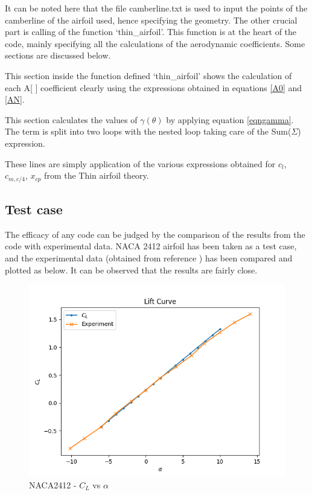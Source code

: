 \documentclass[letterpaper,12pt]{article}
\begin{document}


It can be noted here that the file camberline.txt is used to input the points of the camberline of the airfoil used, hence specifying the geometry. The other crucial part is calling of the function `thin\_airfoil'. This function is at the heart of the code, mainly specifying all the calculations of the aerodynamic coefficients. Some sections are discussed below.



This section inside the function defined `thin\_airfoil' shows the calculation of each A[ ] coefficient clearly using the expressions obtained in equations \ref{A0} and \ref{AN}.



This section calculates the values of $\gamma(\theta)$ by applying equation \ref{eqngamma}. The term is split into two loops with the nested loop taking care of the Sum($\Sigma$) expression.


These lines are simply application of the various expressions obtained for $c_l$, $c_{m,c/4}$, $x_{cp}$ from the Thin airfoil theory.

\subsection{Test case}
The efficacy of any code can be judged by the comparison of the results from the code with experimental data. NACA 2412 airfoil has been taken as a test case, and the experimental data (obtained from reference \cite{naca}) has been compared and plotted as below. It can be observed that the results are fairly close.
\begin{figure}[H]
\includegraphics[scale=0.8]{1.6_cl_2412}
\centering
\caption{NACA2412 - $C_L$ vs $\alpha$}
\centering
\end{figure}
\end{document}
